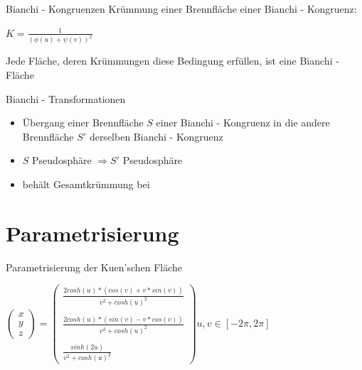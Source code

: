 \documentclass[12pt]{beamer}
\begin{document}
\begin{frame}{Bianchi - Kongruenzen}
Krümmung einer Brennfläche einer Bianchi - Kongruenz:
\newline 
\begin{center}
$K = \frac{1}{(\phi(u) + \psi(v))^2}$
\end{center}


Jede Fläche, deren Krümmungen diese Bedingung erfüllen, ist eine Bianchi - Fläche \cite{b_congruence_enc}
\end{frame}

\begin{frame}{Bianchi - Transformationen}

\begin{itemize}
\item Übergang einer Brennfläche $S$ einer Bianchi - Kongruenz in die andere Brennfläche $S'$ derselben Bianchi - Kongruenz
\item $S$ Pseudosphäre $\Rightarrow S'$ Pseudosphäre
\item behält Gesamtkrümmung bei
\end{itemize}

\end{frame}


\section{Parametrisierung}
\begin{frame}{Parametrisierung der Kuen'schen Fläche}

\begin{center}
$
\begin{pmatrix}
x\\y\\z
\end{pmatrix}
 =
\begin{pmatrix}
\frac{2cosh(u)* \left( cos(v) + v*sin(v) \right)}{v^2+cosh(u)^2}\\\\
\frac{2cosh(u)*(sin(v) - v*cos(v))}{v^2 + cosh(u)^2}\\\\
\frac{sinh(2u)}{v^2 + cosh(u)^2}
\end{pmatrix}
u,v \in \left[ -2\pi , 2\pi \right] $
\end{center}

\end{frame}
\end{document}
